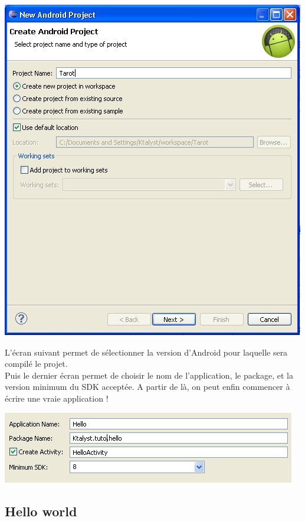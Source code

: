 \documentclass[a4paper]{report}
\begin{document}
			\begin{center}
				\includegraphics[scale=0.5]{Images/deux.jpg}
			\end{center}

			L’écran suivant permet de sélectionner la version d’Android pour laquelle sera compilé le projet.\\
			Puis le dernier écran permet de choisir le nom de l’application, le package, et la version minimum du SDK acceptée. A partir de là, on peut enfin commencer à écrire une vraie 				application !\\

			\begin{center}
				\includegraphics[scale=0.5]{Images/trois.jpg}
			\end{center}
		\subsection{Hello world}
			
\end{document}
